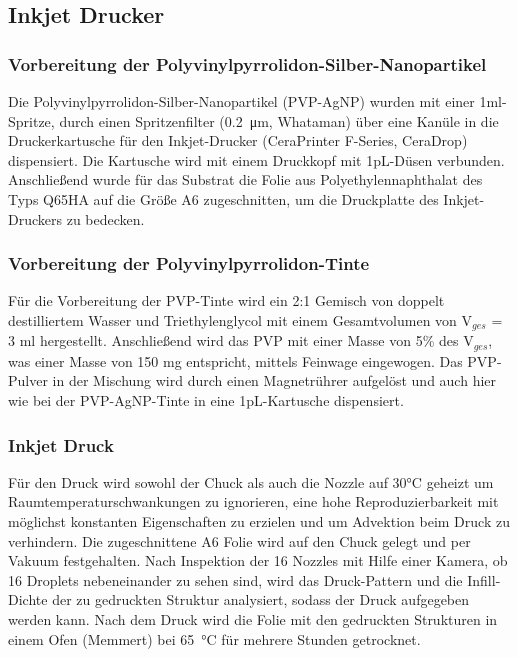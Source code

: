 \subsection{Inkjet Drucker}

\subsubsection{Vorbereitung der Polyvinylpyrrolidon-Silber-Nanopartikel}

Die Polyvinylpyrrolidon-Silber-Nanopartikel (PVP-AgNP) wurden mit einer 1ml-Spritze, durch einen Spritzenfilter (\SI{0.2}{\micro\meter}, Whataman) über eine Kanüle in die Druckerkartusche für den Inkjet-Drucker (CeraPrinter F-Series, CeraDrop) dispensiert. Die Kartusche wird mit einem Druckkopf mit 1pL-Düsen verbunden. Anschließend wurde für das Substrat die Folie aus Polyethylennaphthalat des Typs Q65HA auf die Größe A6 zugeschnitten, um die Druckplatte des Inkjet-Druckers zu bedecken. 

\subsubsection{Vorbereitung der Polyvinylpyrrolidon-Tinte}

Für die Vorbereitung der PVP-Tinte  wird ein 2:1 Gemisch von doppelt destilliertem Wasser und Triethylenglycol mit einem Gesamtvolumen von V$_{ges}$ = 3 ml hergestellt. Anschließend wird das PVP mit einer Masse von 5\% des V$_{ges}$, was einer Masse von 150 mg entspricht, mittels Feinwage eingewogen. Das PVP-Pulver in der Mischung wird durch einen Magnetrührer aufgelöst und auch hier wie bei der PVP-AgNP-Tinte in eine 1pL-Kartusche dispensiert.

\subsubsection{Inkjet Druck}

Für den Druck wird sowohl der Chuck als auch die Nozzle auf 30°C geheizt um Raumtemperaturschwankungen zu ignorieren, eine hohe Reproduzierbarkeit mit möglichst konstanten Eigenschaften zu erzielen und um Advektion beim Druck zu verhindern. Die zugeschnittene A6 Folie wird auf den Chuck gelegt und per Vakuum festgehalten. Nach Inspektion der 16 Nozzles mit Hilfe einer Kamera, ob 16 Droplets nebeneinander zu sehen sind, wird das Druck-Pattern und die Infill-Dichte der zu gedruckten Struktur analysiert, sodass der Druck aufgegeben werden kann. Nach dem Druck wird die Folie mit den gedruckten Strukturen in einem Ofen (Memmert) bei \SI{65}{\celsius} für mehrere Stunden getrocknet.

